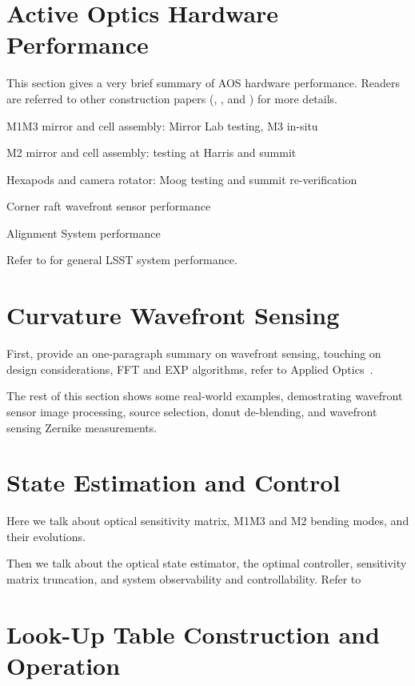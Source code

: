 

\section{Active Optics Hardware Performance}

This section gives a very brief summary of AOS hardware performance.
Readers are referred to other construction papers (\cite{PSTN-006}, \cite{PSTN-046}, and \cite{PSTN-011}) for more details.

M1M3 mirror and cell assembly: Mirror Lab testing, M3 in-situ

M2 mirror and cell assembly: testing at Harris and summit

Hexapods and camera rotator: Moog testing and summit re-verification

Corner raft wavefront sensor performance


Alignment System performance

Refer to \cite{PSTN-032} for general LSST system performance.

\section{Curvature Wavefront Sensing}

First, provide an one-paragraph summary on wavefront sensing, touching on
design considerations, FFT and EXP algorithms, refer to Applied Optics~\cite{2015ApOpt..54.9045X}.

The rest of this section shows some real-world examples,
demostrating wavefront sensor image processing, source selection, donut de-blending, and wavefront sensing Zernike measurements.

\section{State Estimation and Control}

Here we talk about optical sensitivity matrix,
M1M3 and M2 bending modes, and their evolutions.

Then we talk about the optical state estimator, the optimal controller, sensitivity matrix truncation,
and system observability and controllability. Refer to \cite{2014SPIE.9150E..0HA}

\section{Look-Up Table Construction and Operation}

